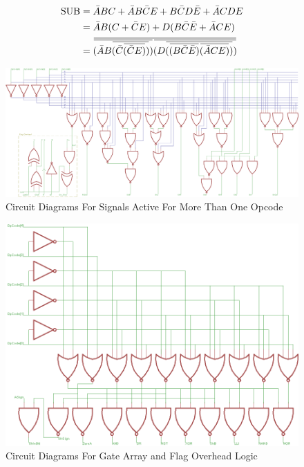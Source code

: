 \newcommand{\overbar}[1]{\mkern 1.5mu\overline{\mkern-1.5mu#1\mkern-1.5mu}\mkern 1.5mu}
\begin{align}
	\text{SUB} &= \bar{A}BC + \bar{A}B\bar{C}E + B\bar{C}D\bar{E} + \bar{A}CDE \label{eq:DecSUB1}\\
	&= \bar{A}B(C + \bar{C}E) + D(B\bar{C}\bar{E} + \bar{A}CE) \label{eq:DecSUB2}\\
	&= \overbar{\overbar{(\bar{A}B\overbar{(\bar{C}\overbar{(\bar{C}E)})})}\overbar{(D\overbar{(\overbar{(B\bar{C}\bar{E})}\overbar{(\bar{A}CE)})})}} \label{eq:DecSUB3}
\end{align}

\begin{figure}[h]
	\centering
	\includegraphics[width=\textwidth]{Figures/ALUDecoderMore1v2.png}
	\caption{Circuit Diagrams For Signals Active For More Than One Opcode}
	\label{fig:DecMultiCirs}
\end{figure}

\begin{figure}[h]
	\centering
	\includegraphics[scale=0.75]{Figures/ALUDecoderGateArrayv2.png}
	\caption{Circuit Diagrams For Gate Array and Flag Overhead Logic}
	\label{fig:GateArray}
\end{figure}

